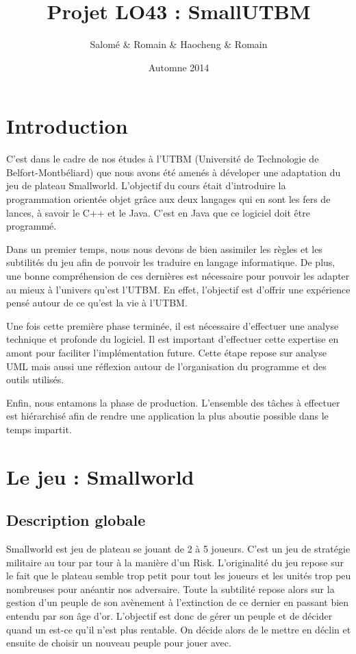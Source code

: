 \documentclass[11pt]{report}
\title{ Projet LO43 : SmallUTBM}
\author{Salomé \bsc{Welche} \& Romain \bsc{Dulieu} \& Haocheng \bsc{Xu} \& Romain \bsc{Thibaud}}
\date{Automne 2014}
\begin{document}
\maketitle

\tableofcontents

\chapter{Introduction}

C'est dans le cadre de nos études à l'UTBM (Université de Technologie de Belfort-Montbéliard) que nous avons été amenés à déveloper une adaptation du jeu de plateau Smallworld\up{\copyright}. L'objectif du cours était d'introduire la programmation orientée objet grâce aux deux langages qui en sont les fers de lances, à savoir le C++ et le Java. C'est en Java que ce logiciel doit être programmé. 

Dans un premier temps, nous nous devons de bien assimiler les règles et les subtilités du jeu afin de pouvoir les traduire en langage informatique. De plus, une bonne compréhension de ces dernières est nécessaire pour pouvoir les adapter au mieux à l'univers qu'est l'UTBM. En effet, l'objectif est d'offrir une expérience pensé autour de ce qu'est la vie à l'UTBM.

Une fois cette première phase terminée, il est nécessaire d'effectuer une analyse technique et profonde du logiciel. Il est important d'effectuer cette expertise en amont pour faciliter l'implémentation future. Cette étape repose sur analyse UML mais aussi une réflexion autour de l'organisation du programme et des outils utilisés.

Enfin, nous entamons la phase de production. L'ensemble des tâches à effectuer est hiérarchisé afin de rendre une application la plus aboutie possible dans le temps impartit.

\chapter{Le jeu : Smallworld}

	\section{Description globale}
		Smallworld\up{\copyright} est jeu de plateau se jouant de 2 à 5 joueurs. C'est un jeu de stratégie militaire au tour par tour à la manière d'un Risk\up{\copyright}. L'originalité du jeu repose sur le fait que le plateau semble trop petit pour tout les joueurs et les unités trop peu nombreuses pour anéantir nos adversaire. Toute la subtilité repose alors sur la gestion d'un peuple de son avènement à l'extinction de ce dernier en passant bien entendu par son âge d'or. L'objectif est donc de gérer un peuple et de décider quand un est-ce qu'il n'est plus rentable. On décide alors de le mettre en déclin et ensuite de choisir un nouveau peuple pour jouer avec. 
		
\end{document}
